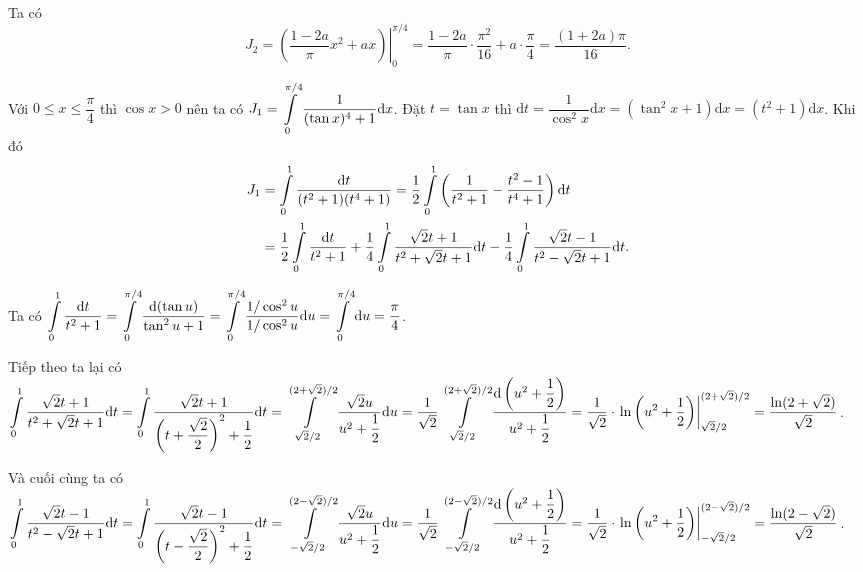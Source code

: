 \begin{enumerate}
{    Ta có $$J_2 = \left.\left(\dfrac{1-2a}{\pi}x^2 + ax\right)\right|^{\pi/4}_{0} = \dfrac{1 - 2a}{\pi}\cdot \dfrac{\pi^2}{16} + a\cdot \dfrac{\pi}{4} = \dfrac{(1+2a)\pi}{16}.$$
    
    Với $0 \leq x \leq \dfrac{\pi}{4}$ thì $\cos x > 0$ nên ta có $J_1 = \displaystyle\int\displaylimits_{0}^{\pi/4}\dfrac{1}{(\tan x)^4 + 1}\mathrm{d}x$. Đặt $t = \tan x$ thì $\mathrm{d}t = \dfrac{1}{\cos^2 x}\mathrm{d}x = \left(\tan^2 x + 1\right)\mathrm{d}x = (t^2 + 1)\mathrm{d}x$. Khi đó 
    \begin{align*}
        J_1 &= \displaystyle\int\displaylimits_{0}^{1}\dfrac{\mathrm{d}t}{(t^2 + 1)(t^4 + 1)} = \dfrac{1}{2}\displaystyle\int\displaylimits_{0}^{1}\left(\dfrac{1}{t^2 + 1} - \dfrac{t^2 - 1}{t^4 + 1}\right)\mathrm{d}t \\
        &= \dfrac{1}{2}\int\displaylimits_{0}^{1}\dfrac{\mathrm{d}t}{t^2 + 1} + \dfrac{1}{4}\int\displaylimits_{0}^{1}\dfrac{\sqrt{2}t + 1}{t^2 + \sqrt{2}t + 1}\mathrm{d}t - \dfrac{1}{4}\int\displaylimits_{0}^{1}\dfrac{\sqrt{2}t - 1}{t^2 - \sqrt{2}t + 1}\mathrm{d}t.
    \end{align*}

    Ta có $\displaystyle\int\displaylimits_{0}^{1}\dfrac{\mathrm{d}t}{t^2 + 1} = \displaystyle\int\displaylimits_{0}^{\pi/4}\dfrac{\mathrm{d}(\tan u)}{\tan^2u + 1} = \displaystyle\int\displaylimits_{0}^{\pi/4}\dfrac{1/\cos^2u}{1/\cos^2u}\mathrm{d}u = \displaystyle\int\displaylimits_{0}^{\pi/4}\mathrm{d}u = \dfrac{\pi}{4}$.

    Tiếp theo ta lại có $\displaystyle\int\displaylimits_{0}^{1}\dfrac{\sqrt{2}t + 1}{t^2 + \sqrt{2}t + 1}\mathrm{d}t = \displaystyle\int\displaylimits_{0}^{1}\dfrac{\sqrt{2}t + 1}{\left(t + \dfrac{\sqrt{2}}{2}\right)^2 + \dfrac{1}{2}}\mathrm{d}t = \displaystyle\int\displaylimits_{\sqrt{2}/2}^{(2+\sqrt{2})/2}\dfrac{\sqrt{2}u}{u^2 + \dfrac{1}{2}}\mathrm{d}u = \dfrac{1}{\sqrt{2}}\displaystyle\int\displaylimits_{\sqrt{2}/2}^{(2+\sqrt{2})/2}\dfrac{\mathrm{d}\left(u^2 + \dfrac{1}{2}\right)}{u^2 + \dfrac{1}{2}} = \dfrac{1}{\sqrt{2}}\cdot \left.\ln \left(u^2 + \dfrac{1}{2}\right)\right|_{\sqrt{2}/2}^{(2+\sqrt{2})/2} = \dfrac{\ln (2 + \sqrt{2})}{\sqrt{2}}$.

    Và cuối cùng ta có $\displaystyle\int\displaylimits_{0}^{1}\dfrac{\sqrt{2}t - 1}{t^2 - \sqrt{2}t + 1}\mathrm{d}t = \displaystyle\int\displaylimits_{0}^{1}\dfrac{\sqrt{2}t - 1}{\left(t - \dfrac{\sqrt{2}}{2}\right)^2 + \dfrac{1}{2}}\mathrm{d}t = \displaystyle\int\displaylimits_{-\sqrt{2}/2}^{(2-\sqrt{2})/2}\dfrac{\sqrt{2}u}{u^2 + \dfrac{1}{2}}\mathrm{d}u = \dfrac{1}{\sqrt{2}}\displaystyle\int\displaylimits_{-\sqrt{2}/2}^{(2-\sqrt{2})/2}\dfrac{\mathrm{d}\left(u^2 + \dfrac{1}{2}\right)}{u^2 + \dfrac{1}{2}} = \dfrac{1}{\sqrt{2}}\cdot \left.\ln \left(u^2 + \dfrac{1}{2}\right)\right|_{-\sqrt{2}/2}^{(2-\sqrt{2})/2} = \dfrac{\ln (2 - \sqrt{2})}{\sqrt{2}}$.

}
\end{enumerate}

